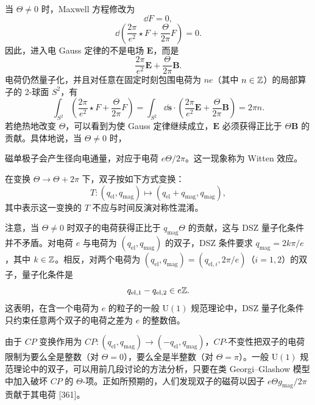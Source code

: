 当 $\Theta\ne 0$ 时，Maxwell 方程修改为
\begin{equation}
\dd F=0, \tag{19.10}
\end{equation}
\begin{equation}
\dd\left(\frac{2\pi}{e^2}\star F+\frac{\Theta}{2\pi}F\right)=0. \tag{19.11}
\end{equation}
因此，进入电 Gauss 定律的不是电场 $\mathbf{E}$，而是
\[
\frac{2\pi}{e^2}\mathbf{E}+\frac{\Theta}{2\pi}\mathbf{B}.
\]
电荷仍然量子化，并且对任意在固定时刻包围电荷为 $ne$（其中 $n\in\mathbb{Z}$）的局部算子的 2-球面 $S^2$，有
\[
\int_{S^2}\left(\frac{2\pi}{e^2}\star F+\frac{\Theta}{2\pi}F\right)
=\int_{S^2}\dd\mathbf{s}\cdot\left(\frac{2\pi}{e^2}\mathbf{E}+\frac{\Theta}{2\pi}\mathbf{B}\right)=2\pi n.
\]
若绝热地改变 $\Theta$，可以看到为使 Gauss 定律继续成立，$\mathbf{E}$ 必须获得正比于 $\Theta\mathbf{B}$ 的贡献。具体地说，当 $\Theta\ne 0$ 时，


磁单极子会产生径向电通量，对应于电荷 $e\Theta/2\pi$。这一现象称为 Witten 效应。

\begin{proposition}[19.15]
在变换 $\Theta\to\Theta+2\pi$ 下，双子按如下方式变换：
\begin{equation}
T\colon (q_{\mathrm{el}},q_{\mathrm{mag}})\longmapsto(q_{\mathrm{el}}+q_{\mathrm{mag}},q_{\mathrm{mag}}), \tag{19.12}
\end{equation}
其中表示这一变换的 $T$ 不应与时间反演对称性混淆。
\end{proposition}

\begin{remark}[19.16]
注意，当 $\Theta\ne 0$ 时双子的电荷获得正比于 $q_{\mathrm{mag}}\Theta$ 的贡献，这与 DSZ 量子化条件并不矛盾。对电荷 $e$ 与电荷为 $(q_{\mathrm{el}},q_{\mathrm{mag}})$ 的双子，DSZ 条件要求 $q_{\mathrm{mag}}=2k\pi/e$，其中 $k\in\mathbb{Z}$。相反，对两个电荷为 $(q_{\mathrm{el}},q_{\mathrm{mag}})=(q_{\mathrm{el},i},2\pi/e)$（$i=1,2$）的双子，量子化条件是
\[
q_{\mathrm{el},1}-q_{\mathrm{el},2}\in e\mathbb{Z} .
\]
这表明，在含一个电荷为 $e$ 的粒子的一般 $\mathrm{U}(1)$ 规范理论中，DSZ 量子化条件只约束任意两个双子的电荷之差为 $e$ 的整数倍。
\end{remark}

由于 $CP$ 变换作用为 $CP\colon (q_{\mathrm{el}},q_{\mathrm{mag}})\to(-q_{\mathrm{el}},q_{\mathrm{mag}})$，$CP$-不变性把双子的电荷限制为要么全是整数（对 $\Theta=0$），要么全是半整数（对 $\Theta=\pi$）。一般 $\mathrm{U}(1)$ 规范理论中的双子，可以用前几段讨论的方法分析，只要在类 Georgi--Glashow 模型中加入破坏 $CP$ 的 $\Theta$-项。正如所预期的，人们发现双子的磁荷以因子 $e\Theta g_{\mathrm{mag}}/2\pi$ 贡献于其电荷 [361]。

